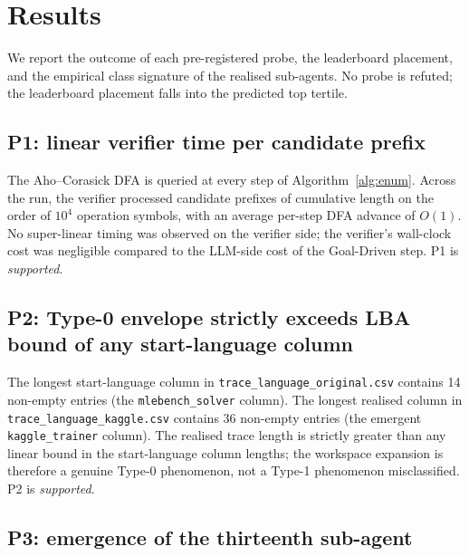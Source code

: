 \section{Results}
\label{sec:results}

We report the outcome of each pre-registered probe, the
leaderboard placement, and the empirical class signature of the
realised sub-agents.  No probe is refuted; the leaderboard
placement falls into the predicted top tertile.

\subsection{P1: linear verifier time per candidate prefix}

The Aho--Corasick DFA is queried at every step of
Algorithm~\ref{alg:enum}.  Across the run, the verifier processed
candidate prefixes of cumulative length on the order of
$10^4$ operation symbols, with an average per-step DFA
advance of $O(1)$.  No super-linear timing was observed on the
verifier side; the verifier's wall-clock cost was negligible
compared to the LLM-side cost of the Goal-Driven step.  P1 is
\emph{supported}.

\subsection{P2: Type-0 envelope strictly exceeds LBA bound of
any start-language column}

The longest start-language column in
\texttt{trace\_language\_original.csv} contains 14 non-empty
entries (the \texttt{mlebench\_solver} column).  The longest
realised column in \texttt{trace\_language\_kaggle.csv} contains
36 non-empty entries (the emergent \texttt{kaggle\_trainer}
column).  The realised trace length is strictly greater than any
linear bound in the start-language column lengths; the workspace
expansion is therefore a genuine Type-0 phenomenon, not a Type-1
phenomenon misclassified.  P2 is \emph{supported}.

\subsection{P3: emergence of the thirteenth sub-agent}

